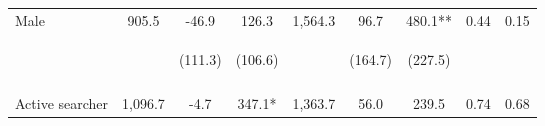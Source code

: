 \begin{tabular}{lcccccccc}
\noalign{\smallskip}Male & 905.5 & -46.9 & 126.3 & 1,564.3 & 96.7 & 480.1** & 0.44 & 0.15\\
 & \begin{footnotesize}\end{footnotesize} & \begin{footnotesize}(111.3)\end{footnotesize} & \begin{footnotesize}(106.6)\end{footnotesize} & \begin{footnotesize}\end{footnotesize} & \begin{footnotesize}(164.7)\end{footnotesize} & \begin{footnotesize}(227.5)\end{footnotesize} & \begin{footnotesize}\end{footnotesize} & \begin{footnotesize}\end{footnotesize}\\
 & \begin{footnotesize}\end{footnotesize} & \begin{footnotesize}[1.000]\end{footnotesize} & \begin{footnotesize}[0.077]\end{footnotesize} & \begin{footnotesize}\end{footnotesize} & \begin{footnotesize}[1.000]\end{footnotesize} & \begin{footnotesize}[0.222]\end{footnotesize} & \begin{footnotesize}\end{footnotesize} & \begin{footnotesize}\end{footnotesize}\\
\noalign{\smallskip}Active searcher & 1,096.7 & -4.7 & 347.1* & 1,363.7 & 56.0 & 239.5 & 0.74 & 0.68\\

\end{tabular}
